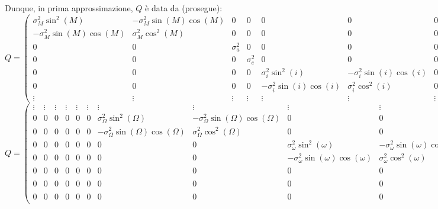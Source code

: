 \documentclass[12pt,a4paper,openright,twoside]{book}
\begin{document}
Dunque, in prima approssimazione, $Q$ è data da (prosegue):
\begin{equation}
Q=\left(\begin{smallmatrix}
\sigma_M^2\sin^2(M) & -\sigma_M^2\sin(M)\cos(M) & 0 & 0 & 0 & 0 & 0 & 0 & 0 & 0 & 0 & 0 & 0 \\
-\sigma_M^2\sin(M)\cos(M) & \sigma_M^2\cos^2(M) & 0 & 0 & 0 & 0 & 0 & 0 & 0 & 0 & 0 & 0 & 0 \\
0 & 0 & \sigma_a^2 & 0 & 0 & 0 & 0 & 0 & 0 & 0 & 0 & 0 & 0 \\
0 & 0 & 0 & \sigma_e^2 & 0 & 0 & 0 & 0 & 0 & 0 & 0 & 0 & 0 \\
0 & 0 & 0 & 0 & \sigma_i^2\sin^2(i) & -\sigma_i^2\sin(i)\cos(i) & 0 & 0 & 0 & 0 & 0 & 0 & 0 \\
0 & 0 & 0 & 0 & -\sigma_i^2\sin(i)\cos(i) & \sigma_i^2\cos^2(i) & 0 & 0 & 0 & 0 & 0 & 0 & 0 \\
\vdots & \vdots & \vdots & \vdots & \vdots & \vdots & \vdots & \vdots & \vdots & \vdots & \vdots & \vdots & \vdots
\end{smallmatrix}\right)
\end{equation}
\begin{equation}
Q=\left(\begin{smallmatrix}
\vdots & \vdots & \vdots & \vdots & \vdots & \vdots & \vdots & \vdots & \vdots & \vdots & \vdots & \vdots & \vdots \\
0 & 0 & 0 & 0 & 0 & 0 & \sigma_\Omega^2\sin^2(\Omega) & -\sigma_\Omega^2\sin(\Omega)\cos(\Omega) & 0 & 0 & 0 & 0 & 0 \\
0 & 0 & 0 & 0 & 0 & 0 & -\sigma_\Omega^2\sin(\Omega)\cos(\Omega) & \sigma_\Omega^2\cos^2(\Omega) & 0 & 0 & 0 & 0 & 0 \\
0 & 0 & 0 & 0 & 0 & 0 & 0 & 0 & \sigma_\omega^2\sin^2(\omega) & -\sigma_\omega^2\sin(\omega)\cos(\omega) & 0 & 0 & 0 \\
0 & 0 & 0 & 0 & 0 & 0 & 0 & 0 & -\sigma_\omega^2\sin(\omega)\cos(\omega) & \sigma_\omega^2\cos^2(\omega) & 0 & 0 & 0 \\
0 & 0 & 0 & 0 & 0 & 0 & 0 & 0 & 0 & 0 & \sigma_n^2 & 0 & 0 \\
0 & 0 & 0 & 0 & 0 & 0 & 0 & 0 & 0 & 0 & 0 & \sigma_H^2 & 0 \\
0 & 0 & 0 & 0 & 0 & 0 & 0 & 0 & 0 & 0 & 0 & 0 & \sigma_G^2
\end{smallmatrix}\right)
\end{equation}
\end{document}
